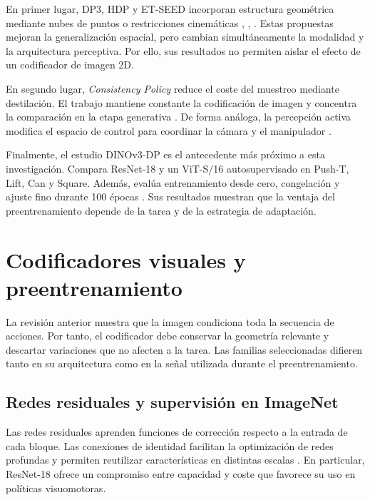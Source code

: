 En primer lugar, DP3, HDP y ET-SEED incorporan estructura geom\'etrica mediante
nubes de puntos o restricciones cinem\'aticas \cite{ze2024dp3}, \cite{ma2024hdp},
\cite{tie2025etseed}. Estas propuestas mejoran la generalizaci\'on espacial, pero
cambian simult\'aneamente la modalidad y la arquitectura perceptiva. Por ello, sus
resultados no permiten aislar el efecto de un codificador de imagen 2D.

En segundo lugar, \textit{Consistency Policy} reduce el coste del muestreo mediante
destilaci\'on. El trabajo mantiene constante la codificaci\'on de imagen y concentra
la comparaci\'on en la etapa generativa \cite{prasad2024consistency}. De forma
an\'aloga, la percepci\'on activa modifica el espacio de control para coordinar la
c\'amara y el manipulador \cite{sun2024active}.

Finalmente, el estudio DINOv3-DP es el antecedente m\'as pr\'oximo a esta
investigaci\'on. Compara ResNet-18 y un ViT-S/16 autosupervisado en Push-T, Lift, Can
y Square. Adem\'as, eval\'ua entrenamiento desde cero, congelaci\'on y ajuste fino
durante 100 \'epocas \cite{egbe2025dinov3dp}. Sus resultados muestran que la ventaja
del preentrenamiento depende de la tarea y de la estrategia de adaptaci\'on.

\section{Codificadores visuales y preentrenamiento}
\label{sec:codificadores-visuales}

La revisi\'on anterior muestra que la imagen condiciona toda la secuencia de acciones.
Por tanto, el codificador debe conservar la geometr\'ia relevante y descartar
variaciones que no afecten a la tarea. Las familias seleccionadas difieren tanto en
su arquitectura como en la se\~nal utilizada durante el preentrenamiento.

\subsection{Redes residuales y supervisi\'on en ImageNet}
\label{subsec:resnet-imagenet}

Las redes residuales aprenden funciones de correcci\'on respecto a la entrada de cada
bloque. Las conexiones de identidad facilitan la optimizaci\'on de redes profundas y
permiten reutilizar caracter\'isticas en distintas escalas \cite{he2016resnet}. En
particular, ResNet-18 ofrece un compromiso entre capacidad y coste que favorece su
uso en pol\'iticas visuomotoras.

